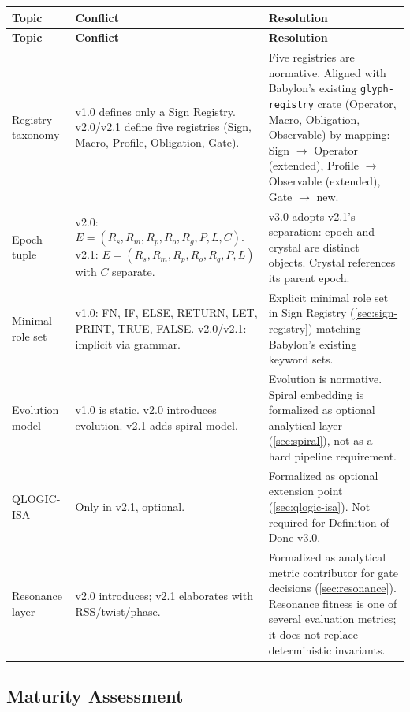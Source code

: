\documentclass[11pt,a4paper,twoside]{article}
\theoremstyle{definition}
\theoremstyle{remark}
\begin{document}
\begin{longtable}{p{3.5cm}p{4.5cm}p{5.5cm}}
\toprule
\textbf{Topic} & \textbf{Conflict} & \textbf{Resolution} \\
\midrule
\endfirsthead
\toprule
\textbf{Topic} & \textbf{Conflict} & \textbf{Resolution} \\
\midrule
\endhead
Registry taxonomy & v1.0 defines only a Sign Registry. v2.0/v2.1 define five registries (Sign, Macro, Profile, Obligation, Gate). & Five registries are normative. Aligned with Babylon's existing \texttt{glyph-registry} crate (Operator, Macro, Obligation, Observable) by mapping: Sign $\to$ Operator (extended), Profile $\to$ Observable (extended), Gate $\to$ new. \\
\addlinespace
Epoch tuple & v2.0: $E = (R_s, R_m, R_p, R_o, R_g, P, L, C)$. v2.1: $E = (R_s, R_m, R_p, R_o, R_g, P, L)$ with $C$ separate. & v3.0 adopts v2.1's separation: epoch and crystal are distinct objects. Crystal references its parent epoch. \\
\addlinespace
Minimal role set & v1.0: FN, IF, ELSE, RETURN, LET, PRINT, TRUE, FALSE. v2.0/v2.1: implicit via grammar. & Explicit minimal role set in Sign Registry (\cref{sec:sign-registry}) matching Babylon's existing keyword sets. \\
\addlinespace
Evolution model & v1.0 is static. v2.0 introduces evolution. v2.1 adds spiral model. & Evolution is normative. Spiral embedding is formalized as optional analytical layer (\cref{sec:spiral}), not as a hard pipeline requirement. \\
\addlinespace
QLOGIC-ISA & Only in v2.1, optional. & Formalized as optional extension point (\cref{sec:qlogic-isa}). Not required for Definition of Done v3.0. \\
\addlinespace
Resonance layer & v2.0 introduces; v2.1 elaborates with RSS/twist/phase. & Formalized as analytical metric contributor for gate decisions (\cref{sec:resonance}). Resonance fitness is one of several evaluation metrics; it does not replace deterministic invariants. \\
\bottomrule
\end{longtable}

\subsection{Maturity Assessment}
\end{document}
